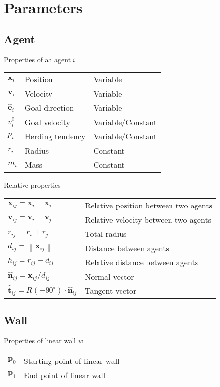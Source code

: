 \section{Parameters}
\subsection{Agent}
Properties of an agent $ i $
\begin{table}[H]
\centering
\begin{tabular}{lll}
$ \mathbf{x}_{i} $       & Position         & Variable \\
$ \mathbf{v}_{i} $       & Velocity         & Variable \\
$ \hat{\mathbf{e}}_{i} $ & Goal direction   & Variable \\
$ v_{i}^{0} $            & Goal velocity    & Variable/Constant \\
$ p_i $                  & Herding tendency & Variable/Constant \\
$ r_{i} $                & Radius           & Constant \\
$ m_{i} $                & Mass             & Constant \\
\end{tabular}
\end{table}

Relative properties
\begin{table}[H]
\centering
\begin{tabular}{ll}
$ \mathbf{x}_{ij} = \mathbf{x}_{i} - \mathbf{x}_{j} $ & Relative position between two agents \\
$ \mathbf{v}_{ij} = \mathbf{v}_{i} - \mathbf{v}_{j} $ & Relative velocity between two agents \\
$ r_{ij} = r_{i} + r_{j} $ & Total radius \\
$ d_{ij} = \left\|\mathbf{x}_{ij}\right\| $ & Distance between agents \\
$ h_{ij} = r_{ij} - d_{ij} $ & Relative distance between agents \\
$ \hat{\mathbf{n}}_{ij} = \mathbf{x}_{ij} / d_{ij} $ & Normal vector \\
$ \hat{\mathbf{t}}_{ij} = R(-90^{\circ}) \cdot \hat{\mathbf{n}}_{ij} $ & Tangent vector \\
\end{tabular}
\end{table}

\subsection{Wall}
Properties of linear wall $ w $
\begin{table}[H]
\begin{tabular}{ll}
$ \mathbf{p}_{0} $ & Starting point of linear wall \\
$ \mathbf{p}_{1} $ & End point of linear wall \\
\end{tabular}
\end{table}


